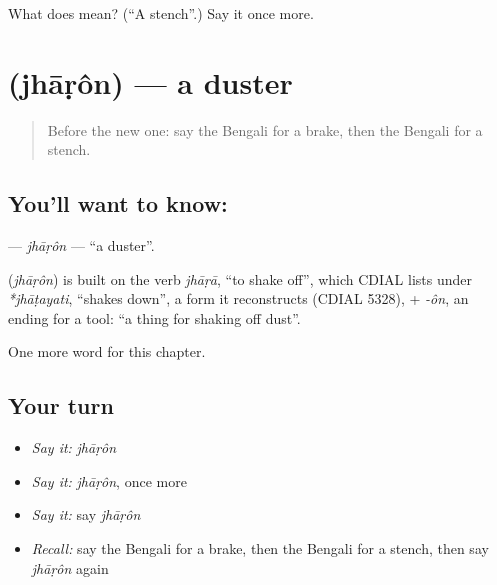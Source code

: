 \begin{tcolorbox}[breakable,colback=teal!4,colframe=teal!35!black,title={Before you move on}]
What does  mean? (\textquotedblleft{}A stench\textquotedblright{}.) Say it once more.
\end{tcolorbox}
\section[\texorpdfstring{\bn{ঝাড়ন} (jhāṛôn)}{ঝাড়ন (jhāṛôn)}]{ (jhāṛôn) — a duster}

\label{lesson:BN-C175-jharon}



\begin{quote}
Before the new one: say the Bengali for a brake, then the Bengali for a stench.
\end{quote}

\subsection*{You'll want to know: }
\textbf{} — \emph{jhāṛôn} — \textquotedblleft{}a duster\textquotedblright{}.

\begin{cousinweb}
\textbf{} (\emph{jhāṛôn}) is built on the verb \emph{jhāṛā}, \textquotedblleft{}to shake off\textquotedblright{}, which CDIAL lists under \emph{*jhāṭayati}, \textquotedblleft{}shakes down\textquotedblright{}, a form it reconstructs (CDIAL 5328), + \emph{-ôn}, an ending for a tool: \textquotedblleft{}a thing for shaking off dust\textquotedblright{}.
\end{cousinweb}

\begin{grammarlens}[title={What you've built}]
One more word for this chapter.
\end{grammarlens}

\subsection*{Your turn}
\begin{itemize}
\raggedright
  \item \emph{Say it:} \emph{jhāṛôn}
  \item \emph{Say it:} \emph{jhāṛôn}, once more
  \item \emph{Say it:} say \emph{jhāṛôn}
  \item \emph{Recall:} say the Bengali for a brake, then the Bengali for a stench, then say \emph{jhāṛôn} again
\end{itemize}

